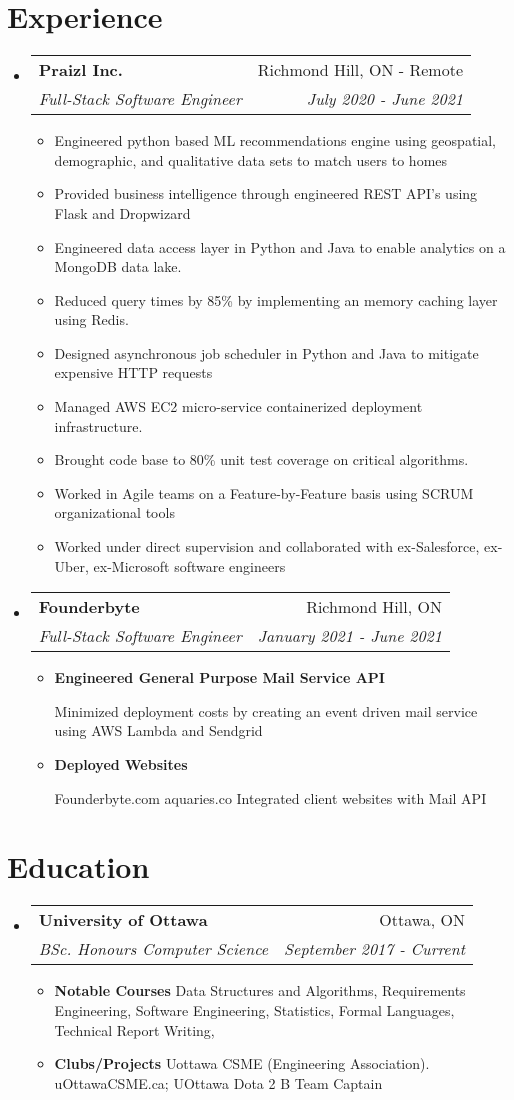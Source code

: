\documentclass[letterpaper,11pt]{article}
\makeatletter
\newcommand{\resumeItem}[2]{
  \item\small{
    \textbf{#1}{#2 \vspace{-2pt}}
  }
}
\newcommand{\resumeSubheading}[4]{
  \vspace{-1pt}\item
    \begin{tabular*}{0.97\textwidth}[t]{l@{\extracolsep{\fill}}r}
      \textbf{#1} & #2 \\
      \textit{\small#3} & \textit{\small #4} \\
    \end{tabular*}\vspace{-5pt}
}
\newcommand{\resumeSubHeadingListStart}{\begin{itemize}[leftmargin=*]}
\newcommand{\resumeSubHeadingListEnd}{\end{itemize}}
\newcommand{\resumeItemListStart}{\begin{itemize}}
\newcommand{\resumeItemListEnd}{\end{itemize}\vspace{-5pt}}
\makeatother
\begin{document}
\section{Experience}
  \resumeSubHeadingListStart
	\resumeSubheading
	{Praizl Inc.}{Richmond Hill, ON - Remote}
	{Full-Stack Software Engineer}{July 2020 - June 2021}
		\resumeItemListStart
			\resumeItem{}
			{Engineered python based ML recommendations engine using geospatial, demographic, and qualitative data sets to match users to homes}
			\resumeItem{}
			{Provided business intelligence through engineered REST API's using Flask and Dropwizard}
			\resumeItem{}
			{Engineered data access layer in Python and Java to enable analytics on a MongoDB data lake.}
			\resumeItem{}
			{Reduced query times by 85\% by implementing an memory caching layer using Redis.}
			\resumeItem{}
			{Designed asynchronous job scheduler in Python and Java to mitigate expensive HTTP requests}
			\resumeItem{}
			{Managed AWS EC2 micro-service containerized deployment infrastructure. }
			\resumeItem{}
			{Brought code base to 80\% unit test coverage on critical algorithms. }
			\resumeItem{}
			{Worked in Agile teams on a Feature-by-Feature basis using SCRUM organizational tools }
			\resumeItem{}
			{Worked under direct supervision and collaborated with ex-Salesforce, ex-Uber, ex-Microsoft software engineers }
		\resumeItemListEnd
	    \resumeSubheading
	      {Founderbyte}{Richmond Hill, ON}
	      {Full-Stack Software Engineer}{January 2021 - June 2021}
	      \resumeItemListStart
		  \resumeItem{Engineered General Purpose Mail Service API}\newline
	          {Minimized deployment costs by creating an event driven mail service using AWS Lambda and Sendgrid}
	        \resumeItem{Deployed Websites} \newline
	          {Founderbyte.com aquaries.co
                Integrated client websites with Mail API}
  
\resumeItemListEnd

\resumeSubHeadingListEnd

\section{Education}
  \resumeSubHeadingListStart
    \resumeSubheading
      {University of Ottawa}{Ottawa, ON}
      {BSc. Honours Computer Science}{September 2017 - Current}
	\resumeItemListStart
		\resumeItem{Notable Courses }
		{Data Structures and Algorithms, Requirements Engineering, Software Engineering, Statistics, Formal Languages, Technical Report Writing, }
	\resumeItem{Clubs/Projects }
		{Uottawa CSME (Engineering Association). uOttawaCSME.ca;
    UOttawa Dota 2 B Team Captain}	
	\resumeItemListEnd
  \resumeSubHeadingListEnd
\end{document}
